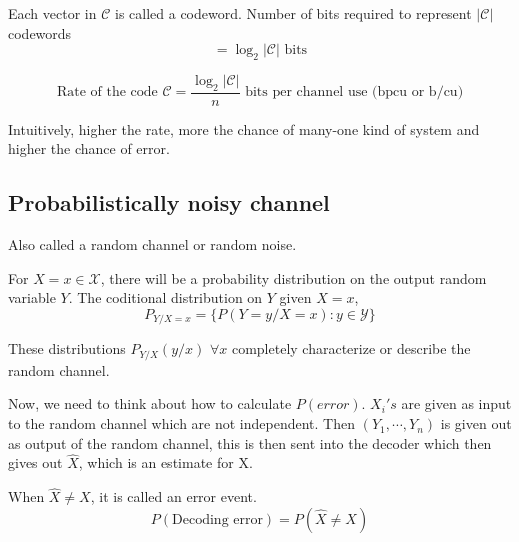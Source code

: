 \documentclass{article}
\begin{document}
Each vector in $\mathscr{C}$ is called a codeword. Number of bits required to represent $|\mathscr{C}|$ codewords
$$ = \log_{2} | \mathscr{C} | \text{ bits}$$

$$ \text{Rate of the code } \mathscr{C}= \frac{\log_2 | \mathscr{C}|}{n} \text{ bits per channel use (bpcu or b/cu)}$$

Intuitively, higher the rate, more the chance of many-one kind of system and higher the chance of error.

\subsection{Probabilistically noisy channel}

Also called a random channel or random noise.

For $X=x \in \mathcal{X}$, there will be a probability distribution on the output random variable $Y$. The coditional distribution on $Y$ given $X=x$,
$$ P_{Y/X=x}= \{ P(Y=y/X=x):y \in \mathcal{Y}\}$$

These distributions $P_{Y/X}(y/x)$ $\forall x$ completely characterize or describe the random channel.

Now, we need to think about how to calculate $P(error)$. $X_i's$ are given as input to the random channel which are not independent. Then $(Y_1,\cdots, Y_n)$ is given out as output of the random channel, this is then sent into the decoder which then gives out $\hat{X}$, which is an estimate for X.

When $\hat{X} \neq X$, it is called an error event.
$$ P(\text{Decoding error})= P(\hat{X} \neq X)$$
\end{document}
